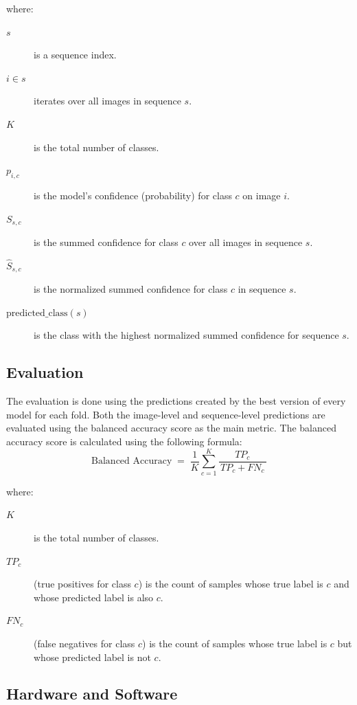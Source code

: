     \noindent where:
    \begin{description}
    \item[$s$] is a sequence index.
    \item[$i \in s$] iterates over all images in sequence $s$.
    \item[$K$] is the total number of classes.
    \item[$p_{i,c}$] is the model's confidence (probability) for class $c$ on image $i$.
    \item[$S_{s,c}$] is the summed confidence for class $c$ over all images in sequence $s$.
    \item[$\hat{S}_{s,c}$] is the normalized summed confidence for class $c$ in sequence $s$.
    \item[$\text{predicted\_class}(s)$] is the class with the highest normalized summed confidence for sequence $s$.
    \end{description}

    \subsection{Evaluation}

    The evaluation is done using the predictions created by the best version of every model for each fold.
    Both the image-level and sequence-level predictions are evaluated using the balanced accuracy score \autocite{brodersenBalancedAccuracyIts2010} as the main metric.
    The balanced accuracy score is calculated using the following formula:
    \begin{equation}
    \text{Balanced Accuracy}
    \;=\;
    \frac{1}{K} \sum_{c=1}^{K}
        \frac{TP_{c}}{\,TP_{c} + FN_{c}\,}
    \end{equation}

    \noindent where:
    \begin{description}
    \item[$K$] is the total number of classes.
    \item[$TP_{c}$] (true positives for class $c$) is the count of samples whose true label is $c$ and whose predicted label is also $c$.
    \item[$FN_{c}$] (false negatives for class $c$) is the count of samples whose true label is $c$ but whose predicted label is not $c$.
    \end{description}


    \subsection{Hardware and Software}

